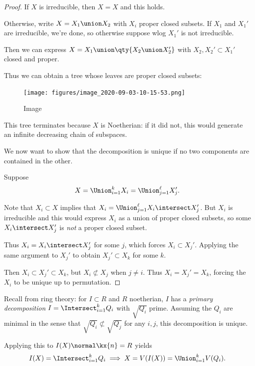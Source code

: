 \begin{proof}

If \(X\) is irreducible, then \(X=X\) and this holds.

Otherwise, write \(X = X_1 \union X_2\) with \(X_i\) proper closed
subsets. If \(X_1\) and \(X_1'\) are irreducible, we're done, so
otherwise suppose wlog \(X_1'\) is not irreducible.

Then we can express \(X = X_1 \union \qty{X_2 \union X_2'}\) with
\(X_2, X_2' \subset X_1'\) closed and proper.

Thus we can obtain a tree whose leaves are proper closed subsets:

\begin{figure}
\centering
\texttt{[image: figures/image\_2020-09-03-10-15-53.png]}
\caption{Image}
\end{figure}

This tree terminates because \(X\) is Noetherian: if it did not, this
would generate an infinite decreasing chain of subspaces.

We now want to show that the decomposition is unique if no two
components are contained in the other.

Suppose
\begin{align*}  
X= \Union_{i=1}^k X_i = \Union_{j=1}^\ell X_j'
.\end{align*}

Note that \(X_i \subset X\) implies that
\(X_i = \Union_{j=1}^\ell X_i \intersect X_j'\). But \(X_i\) is
irreducible and this would express \(X_i\) as a union of proper closed
subsets, so some \(X_i \intersect X_j'\) is \emph{not} a proper closed
subset.

Thus \(X_i = X_i \intersect X_j'\) for some \(j\), which forces
\(X_i \subset X_j'\). Applying the same argument to \(X_j'\) to obtain
\(X_j' \subset X_k\) for some \(k\).

Then \(X_i \subset X_j' \subset X_k\), but \(X_ i \not\subset X_j\) when
\(j\neq i\). Thus \(X_i = X_j' = X_k\), forcing the \(X_i\) to be unique
up to permutation.

\end{proof}

Recall from ring theory: for \(I\subset R\) and \(R\) noetherian, \(I\)
has a \emph{primary decomposition} \(I = \Intersect_{i=1}^k Q_i\) with
\(\sqrt{Q_i}\) prime. Assuming the \(Q_i\) are minimal in the sense that
\(\sqrt{Q_i} \not\subset \sqrt{Q_j}\) for any \(i, j\), this
decomposition is unique.

Applying this to \(I(X) \normal \kx{n} = R\) yields
\begin{align*}  
I(X) = \Intersect_{i=1}^k Q_i 
\implies
X  = V(I(X)) = \Union_{i=1}^k V(Q_i)
.\end{align*}

